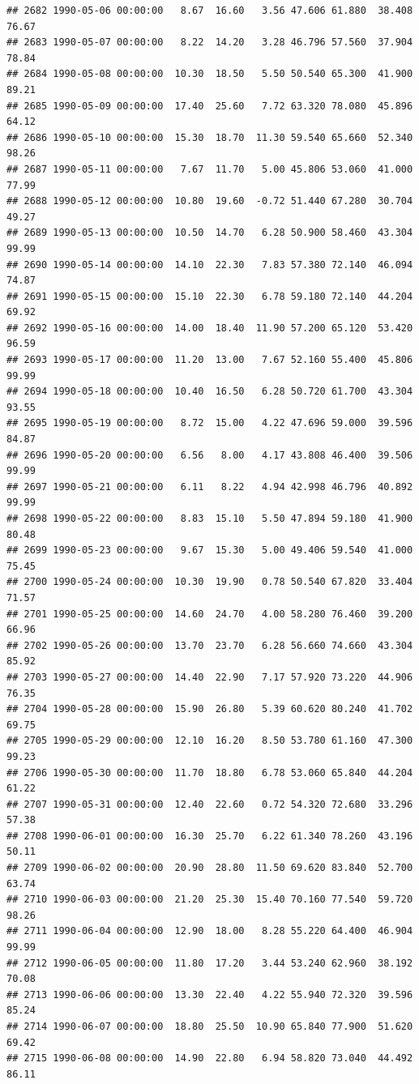\documentclass{article}\usepackage{graphicx, color}
\makeatletter
\newenvironment{kframe}{%
 \def\at@end@of@kframe{}%
 \ifinner\ifhmode%
  \def\at@end@of@kframe{\end{minipage}}%
  \begin{minipage}{\columnwidth}%
 \fi\fi%
 \def\FrameCommand##1{\hskip\@totalleftmargin \hskip-\fboxsep
 \colorbox{shadecolor}{##1}\hskip-\fboxsep
     \hskip-\linewidth \hskip-\@totalleftmargin \hskip\columnwidth}%
 \MakeFramed {\advance\hsize-\width
   \@totalleftmargin\z@ \linewidth\hsize
   \@setminipage}}%
 {\par\unskip\endMakeFramed%
 \at@end@of@kframe}
\newenvironment{knitrout}{}{} %
\makeatother
\begin{document}
\begin{knitrout}
\begin{kframe}
\begin{verbatim}
## 2682 1990-05-06 00:00:00   8.67  16.60   3.56 47.606 61.880  38.408  76.67
## 2683 1990-05-07 00:00:00   8.22  14.20   3.28 46.796 57.560  37.904  78.84
## 2684 1990-05-08 00:00:00  10.30  18.50   5.50 50.540 65.300  41.900  89.21
## 2685 1990-05-09 00:00:00  17.40  25.60   7.72 63.320 78.080  45.896  64.12
## 2686 1990-05-10 00:00:00  15.30  18.70  11.30 59.540 65.660  52.340  98.26
## 2687 1990-05-11 00:00:00   7.67  11.70   5.00 45.806 53.060  41.000  77.99
## 2688 1990-05-12 00:00:00  10.80  19.60  -0.72 51.440 67.280  30.704  49.27
## 2689 1990-05-13 00:00:00  10.50  14.70   6.28 50.900 58.460  43.304  99.99
## 2690 1990-05-14 00:00:00  14.10  22.30   7.83 57.380 72.140  46.094  74.87
## 2691 1990-05-15 00:00:00  15.10  22.30   6.78 59.180 72.140  44.204  69.92
## 2692 1990-05-16 00:00:00  14.00  18.40  11.90 57.200 65.120  53.420  96.59
## 2693 1990-05-17 00:00:00  11.20  13.00   7.67 52.160 55.400  45.806  99.99
## 2694 1990-05-18 00:00:00  10.40  16.50   6.28 50.720 61.700  43.304  93.55
## 2695 1990-05-19 00:00:00   8.72  15.00   4.22 47.696 59.000  39.596  84.87
## 2696 1990-05-20 00:00:00   6.56   8.00   4.17 43.808 46.400  39.506  99.99
## 2697 1990-05-21 00:00:00   6.11   8.22   4.94 42.998 46.796  40.892  99.99
## 2698 1990-05-22 00:00:00   8.83  15.10   5.50 47.894 59.180  41.900  80.48
## 2699 1990-05-23 00:00:00   9.67  15.30   5.00 49.406 59.540  41.000  75.45
## 2700 1990-05-24 00:00:00  10.30  19.90   0.78 50.540 67.820  33.404  71.57
## 2701 1990-05-25 00:00:00  14.60  24.70   4.00 58.280 76.460  39.200  66.96
## 2702 1990-05-26 00:00:00  13.70  23.70   6.28 56.660 74.660  43.304  85.92
## 2703 1990-05-27 00:00:00  14.40  22.90   7.17 57.920 73.220  44.906  76.35
## 2704 1990-05-28 00:00:00  15.90  26.80   5.39 60.620 80.240  41.702  69.75
## 2705 1990-05-29 00:00:00  12.10  16.20   8.50 53.780 61.160  47.300  99.23
## 2706 1990-05-30 00:00:00  11.70  18.80   6.78 53.060 65.840  44.204  61.22
## 2707 1990-05-31 00:00:00  12.40  22.60   0.72 54.320 72.680  33.296  57.38
## 2708 1990-06-01 00:00:00  16.30  25.70   6.22 61.340 78.260  43.196  50.11
## 2709 1990-06-02 00:00:00  20.90  28.80  11.50 69.620 83.840  52.700  63.74
## 2710 1990-06-03 00:00:00  21.20  25.30  15.40 70.160 77.540  59.720  98.26
## 2711 1990-06-04 00:00:00  12.90  18.00   8.28 55.220 64.400  46.904  99.99
## 2712 1990-06-05 00:00:00  11.80  17.20   3.44 53.240 62.960  38.192  70.08
## 2713 1990-06-06 00:00:00  13.30  22.40   4.22 55.940 72.320  39.596  85.24
## 2714 1990-06-07 00:00:00  18.80  25.50  10.90 65.840 77.900  51.620  69.42
## 2715 1990-06-08 00:00:00  14.90  22.80   6.94 58.820 73.040  44.492  86.11

\end{verbatim}
\end{kframe}
\end{knitrout}
\end{document}

